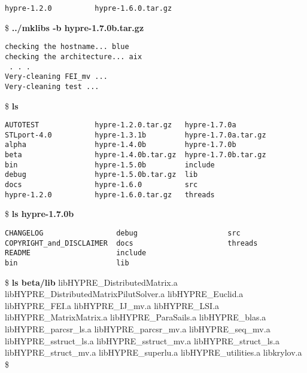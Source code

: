 \begin{ttfamily}
\begin{mdseries}
\begin{verbatim}
hypre-1.2.0          hypre-1.6.0.tar.gz
\end{verbatim}
\$ \textbf{../mklibs -b hypre-1.7.0b.tar.gz}\linebreak
\begin{verbatim}
checking the hostname... blue
checking the architecture... aix
 . . .
Very-cleaning FEI_mv ...
Very-cleaning test ...
\end{verbatim}
\$ \textbf{ls}\linebreak
\begin{verbatim}
AUTOTEST             hypre-1.2.0.tar.gz   hypre-1.7.0a
STLport-4.0          hypre-1.3.1b         hypre-1.7.0a.tar.gz
alpha                hypre-1.4.0b         hypre-1.7.0b
beta                 hypre-1.4.0b.tar.gz  hypre-1.7.0b.tar.gz
bin                  hypre-1.5.0b         include
debug                hypre-1.5.0b.tar.gz  lib
docs                 hypre-1.6.0          src
hypre-1.2.0          hypre-1.6.0.tar.gz   threads
\end{verbatim}
\$ \textbf{ls hypre-1.7.0b}\linebreak
\begin{verbatim}
CHANGELOG                 debug                     src
COPYRIGHT_and_DISCLAIMER  docs                      threads
README                    include
bin                       lib
\end{verbatim}
\$ \textbf{ls beta/lib}\linebreak
libHYPRE\_DistributedMatrix.a\linebreak
libHYPRE\_DistributedMatrixPilutSolver.a\linebreak
libHYPRE\_Euclid.a\linebreak
libHYPRE\_FEI.a\linebreak
libHYPRE\_IJ\_mv.a\linebreak
libHYPRE\_LSI.a\linebreak
libHYPRE\_MatrixMatrix.a\linebreak
libHYPRE\_ParaSails.a\linebreak
libHYPRE\_blas.a\linebreak
libHYPRE\_parcsr\_ls.a\linebreak
libHYPRE\_parcsr\_mv.a\linebreak
libHYPRE\_seq\_mv.a\linebreak
libHYPRE\_sstruct\_ls.a\linebreak
libHYPRE\_sstruct\_mv.a\linebreak
libHYPRE\_struct\_ls.a\linebreak
libHYPRE\_struct\_mv.a\linebreak
libHYPRE\_superlu.a\linebreak
libHYPRE\_utilities.a\linebreak
libkrylov.a\linebreak
\$ \linebreak
\end{mdseries}
\end{ttfamily}

